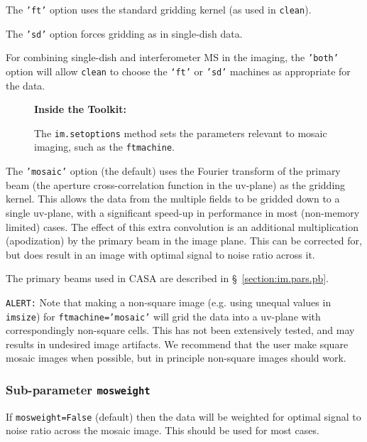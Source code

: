 The {\tt 'ft'} option uses the standard gridding kernel (as used in 
{\tt clean}).

The {\tt 'sd'} option forces gridding as in single-dish data.

For combining single-dish and interferometer MS in the imaging, the
{\tt 'both'} option will allow {\tt clean} to choose the {\tt `ft'}
or {\tt 'sd'} machines as appropriate for the data.

\begin{wrapfigure}{r}{2.5in}
  \begin{boxedminipage}{2.5in}
     \centerline{\bf Inside the Toolkit:}
     The {\tt im.setoptions} method sets the parameters relevant to
     mosaic imaging, such as the {\tt ftmachine}.
  \end{boxedminipage}
\end{wrapfigure}

The {\tt 'mosaic'} option (the default) uses the Fourier transform of the
primary beam (the aperture cross-correlation function in the uv-plane) as
the gridding kernel.  This allows the data from the multiple fields to be
gridded down to a single uv-plane, with a significant speed-up in 
performance in most (non-memory limited) cases.  The effect of this extra
convolution is an additional multiplication (apodization) by the primary
beam in the image plane.  This can be corrected for, but does result in
an image with optimal signal to noise ratio across it.

The primary beams used in CASA are described in \S~\ref{section:im.pars.pb}.

{\tt ALERT:} Note that making a non-square image (e.g. using
unequal values in {\tt imsize}) for {\tt ftmachine='mosaic'} will grid 
the data into a uv-plane with correspondingly non-square cells.  This
has not been extensively tested, and may results in undesired image
artifacts.  We recommend that the user make square mosaic images when
possible, but in principle non-square images should work.

\subsubsection{Sub-parameter {\tt mosweight} }
\label{section:im.imagermode.mosaic.mosweight}

If {\tt mosweight=False} (default) then the data will be
weighted for optimal signal to noise ratio across the mosaic image. 
This should be used for most cases.

